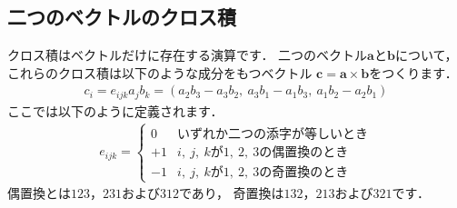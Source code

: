 \subsection{二つのベクトルのクロス積}
\label{ssec:1.3.5}
クロス積はベクトルだけに存在する演算です．
二つのベクトル$\bm{a}$と$\bm{b}$について，
これらのクロス積は以下のような成分をもつベクトル
$\bm{c} = \bm{a} \times \bm{b}$をつくります．
\begin{align}
 \label{eq:1.22}
 c_{i} = e_{ijk}a_{j}b_{k}
 = (a_{2}b_{3} - a_{3}b_{2},\ a_{3}b_{1} - a_{1}b_{3},\  a_{1}b_{2} - a_{2}b_{1})
\end{align}
ここでは以下のように定義されます．
\begin{align}
 \label{eq:1.23}
 e_{ijk} =
 \begin{cases}
  0 & \text{いずれか二つの添字が等しいとき} \\
  +1 & \text{$i,\ j,\ k$が$1,\ 2,\ 3$の偶置換のとき} \\
  -1 & \text{$i,\ j,\ k$が$1,\ 2,\ 3$の奇置換のとき}
 \end{cases}
\end{align}
偶置換とは$123$，$231$および$312$であり，
奇置換は$132$，$213$および$321$です．


